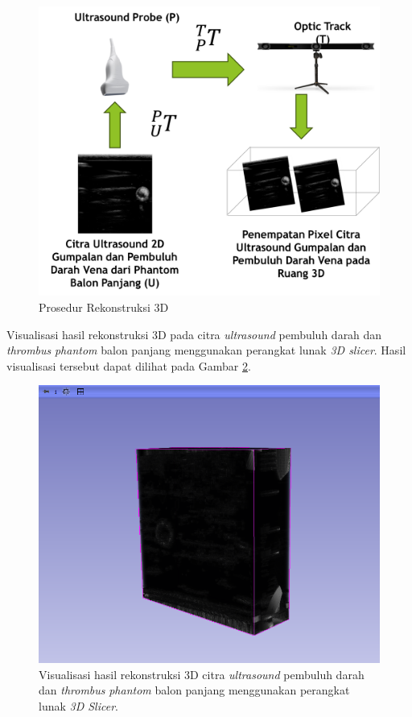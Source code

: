 {\begin{figure}[htbp]
	\centering
	\includegraphics[scale= 0.25]{bab3/prosedur_rekonstruksi.png}
	\caption{Prosedur Rekonstruksi 3D}
	\label{fig:prosedur_rekonstruksi}
\end{figure}

Visualisasi hasil rekonstruksi 3D pada citra \textit{ultrasound} pembuluh darah dan \textit{thrombus} \textit{phantom} balon panjang menggunakan perangkat lunak \textit{3D slicer}. Hasil visualisasi tersebut dapat dilihat pada Gambar \ref{fig:visualisasi_hasil_rekosntruksi}.

\begin{figure}[htbp]
	\centering
	\includegraphics[scale= 0.5]{bab3/Hasil_Rekonstruksi_3d.png}
	\caption{Visualisasi hasil rekonstruksi 3D citra \textit{ultrasound} pembuluh darah dan \textit{thrombus} \textit{phantom} balon panjang menggunakan perangkat lunak \textit{3D Slicer}.}
	\label{fig:visualisasi_hasil_rekosntruksi}
\end{figure}




}
